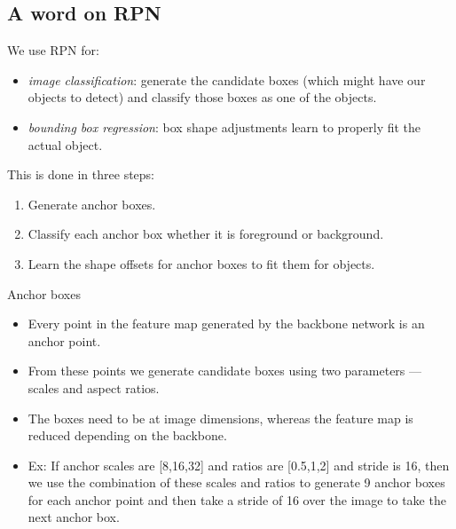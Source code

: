 \documentclass{beamer}
\begin{document}
\subsection{A word on RPN}
\begin{frame}{}
	We use RPN for:
		\begin{itemize}
			\item \emph{image classification}: generate the candidate boxes (which might have our objects to detect) and classify those boxes as one of the objects.
			\item \emph{bounding box regression}: box shape adjustments learn to properly fit the actual object.
		\end{itemize}
	This is done in three steps:
		\begin{enumerate}
			\item Generate anchor boxes.
			\item Classify each anchor box whether it is foreground or background.
			\item Learn the shape offsets for anchor boxes to fit them for objects.
		\end{enumerate}
\end{frame}

\begin{frame}{Anchor boxes}
	\begin{itemize}
		\item Every point in the feature map generated by the backbone network is an anchor point.
		\item From these points we generate candidate boxes using two parameters — scales and aspect ratios.
		\item The boxes need to be at image dimensions, whereas the feature map is reduced depending on the backbone.
		\item Ex: If anchor scales are [8,16,32] and ratios are [0.5,1,2] and stride is 16, then we use the combination of these scales and ratios to generate 9 anchor boxes for each anchor point and then take a stride of 16 over the image to take the next anchor box.
	\end{itemize}
\end{frame}
\end{document}
